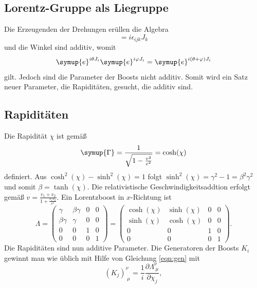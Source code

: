 \documentclass[
  captions=tableheading,  %
  titlepage=firstiscover, %
]{scrartcl}
\begin{document}
\subsection{Lorentz-Gruppe als Liegruppe}
Die Erzeugenden der Drehungen erüllen die Algebra 
\begin{equation*}
  [J_i, J_j] = i \epsilon_{ijk} J_k
\end{equation*}
und die Winkel sind additiv, womit 
\begin{equation*}
  \symup{e}^{i\theta J_i} \symup{e}^{i\varphi J_i} = \symup{e}^{i(\theta + \varphi) J_i}
\end{equation*}
gilt. 
Jedoch sind die Parameter der Boosts nicht additiv. 
Somit wird ein Satz neuer Parameter, die Rapiditäten, gesucht, die additiv sind.
\subsection{Rapiditäten}
Die Rapidität $\chi$ ist gemäß 
\begin{equation*}
  \symup{\Gamma} = \frac{1}{\sqrt{1 - \frac{v^2}{c^2}}} = \cosh(\chi)
\end{equation*}
definiert.
Aus $\cosh^2(\chi) - \sinh^2(\chi) = 1$ folgt $\sinh^2(\chi) = \gamma^2 - 1 = \beta^2\gamma^2$ und somit 
$\beta = \tanh (\chi)$.
Die relativistische Geschwindigkeitsaddtion erfolgt gemäß 
$v = \frac{v_1 + v_2}{1 + \frac{v_1 v_2 }{c^2}}$.
Ein Lorentzboost in $x$-Richtung ist 
\begin{equation*}
  \Lambda  =
  \begin{pmatrix}
    \gamma & \beta \gamma & 0 & 0 \\
    \beta \gamma & \gamma & 0 & 0\\
    0 & 0 & 1 & 0 \\
    0 & 0 & 0 & 1
  \end{pmatrix}
  = 
  \begin{pmatrix}
    \cosh (\chi) & \sinh (\chi) & 0 & 0 \\
    \sinh (\chi) & \cosh (\chi) & 0 & 0\\
    0 & 0 & 1 & 0 \\
    0 & 0 & 0 & 1
  \end{pmatrix}
  .
\end{equation*}
Die Rapiditäten sind nun additive Parameter.
Die Generatoren der Boosts $K_i$ gewinnt man wie üblich mit Hilfe von 
Gleichung \eqref{eqn:gen} mit 
\begin{equation*}
(K_j)_{\; \mu}^{\nu} = \frac{1}{i} \frac{\partial \Lambda_{\; \mu }^{\nu}}{\partial \chi_j} ,
\end{equation*} 
\end{document}
